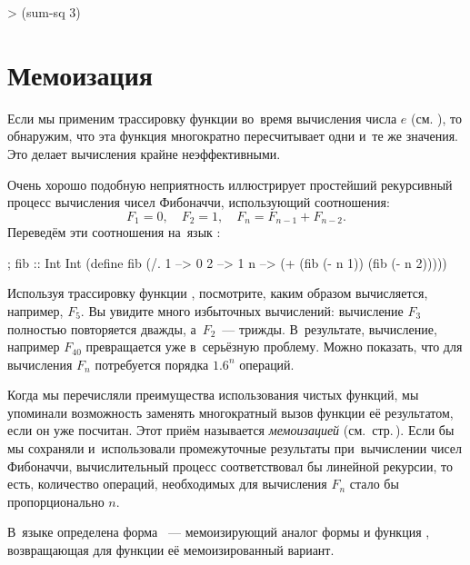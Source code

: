 \begin{SchemeCode}
   > (sum-sq 3)
\end{SchemeCode}

\vspace{-\bigskipamount}
\section[2]{Мемоизация}%
Если мы применим трассировку функции  во~время вычисления числа $e$ (см. ), то обнаружим, что эта функция многократно пересчитывает одни и~те же значения. Это делает вычисления крайне неэффективными.

Очень хорошо подобную неприятность иллюстрирует простейший рекурсивный процесс вычисления чисел Фибоначчи, использующий соотношения:
$$
F_1 = 0,\quad
F_2 = 1,\quad
F_n = F_{n-1} + F_{n-2}.
$$
Переведём эти соотношения на~язык \Scheme:

\begin{Definition}[emph=n]
; fib :: Int \arrow Int
(define fib
  (/. 1 --> 0
      2 --> 1
      n --> (+ (fib (- n 1)) 
              (fib (- n 2)))))
\end{Definition}

Используя трассировку функции , посмотрите, каким образом вычисляется, например, $F_5$. Вы увидите много избыточных вычислений: вычисление $F_3$ полностью повторяется дважды, а~$F_2$~--- трижды. В~результате, вычисление, например $F_{40}$ превращается уже в~серьёзную проблему. Можно показать, что для вычисления $F_n$ потребуется порядка $1.6^n$ операций.

Когда мы перечисляли преимущества использования чистых функций, мы упоминали возможность заменять многократный вызов функции её результатом, если он уже посчитан. Этот приём называется \emph{мемоизацией} (см.~стр.\,\pageref{memo1}). Если бы мы сохраняли и~использовали промежуточные результаты при~вычислении чисел Фибоначчи, вычислительный процесс соответствовал бы линейной рекурсии, то есть, количество операций, необходимых для вычисления $F_n$ стало бы пропорционально $n$.

В~языке \Scheme определена форма ~--- мемоизирующий аналог формы  и функция , возвращающая для функции её мемоизированный вариант.

